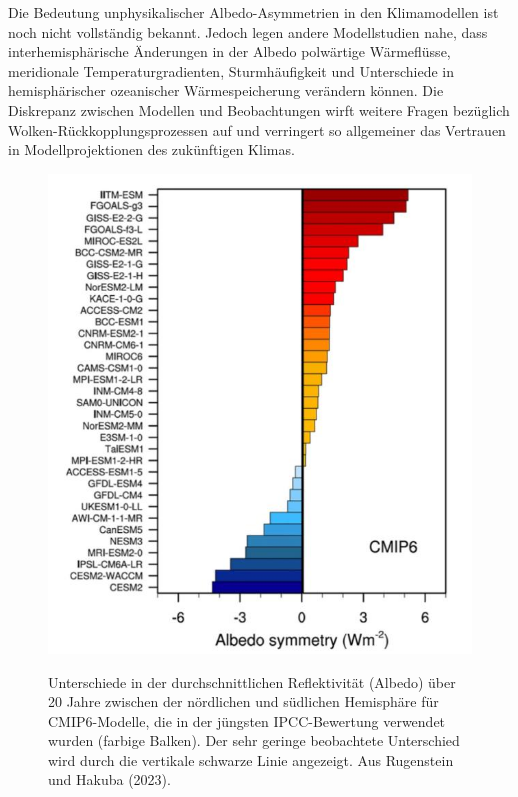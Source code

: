 \documentclass[12pt,paper=a4,DIV=12,parskip=never,chapterprefix=false,headings=standardclasses]{scrreprt}
\begin{document}
Die Bedeutung unphysikalischer Albedo-Asymmetrien in den Klimamodellen ist noch nicht vollständig bekannt. Jedoch legen andere Modellstudien nahe, dass interhemisphärische Änderungen in der Albedo polwärtige Wärmeflüsse, meridionale Temperaturgradienten, Sturmhäufigkeit und Unterschiede in hemisphärischer ozeanischer Wärmespeicherung verändern können. Die Diskrepanz zwischen Modellen und Beobachtungen wirft weitere Fragen bezüglich Wolken-Rückkopplungsprozessen auf und verringert so allgemeiner das Vertrauen in Modellprojektionen des zukünftigen Klimas.
\begin{figure}[H]
\begin{center}
\includegraphics[width=1.0\textwidth]{bilder/bilderKlima-0033.jpg}\\[1cm]
\end{center}
\caption{Unterschiede in der durchschnittlichen Reflektivität (Albedo) über 20 Jahre zwischen der nördlichen und
südlichen Hemisphäre für CMIP6-Modelle, die in der jüngsten IPCC-Bewertung verwendet wurden (farbige Balken).
Der sehr geringe beobachtete Unterschied wird durch die vertikale schwarze Linie angezeigt. Aus Rugenstein und
Hakuba (2023).}
\end{figure}
\end{document}
